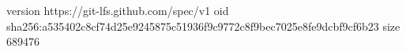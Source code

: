 version https://git-lfs.github.com/spec/v1
oid sha256:a535402c8cf74d25e9245875c51936f9c9772c8f9bec7025e8fe9dcbf9cf6b23
size 689476
